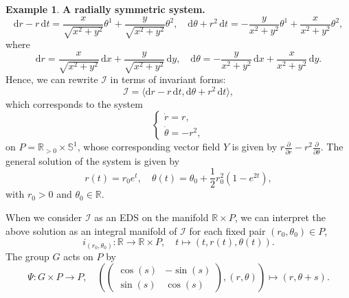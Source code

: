 \documentclass[11pt]{article}
\theoremstyle{plain}
\theoremstyle{definition}
\newtheorem{example}{Example}
\begin{document}
\begin{example} {\bf A radially symmetric system.}
\begin{equation*}
    \mathrm{d}r-r \, \mathrm{d}t=\frac{x}{\sqrt{x^2+y^2}}\theta^1+\frac{y}{\sqrt{x^2+y^2}}\theta^2,\quad \mathrm{d}\theta+r^2 \, \mathrm{d}t=-\frac{y}{x^2+y^2}\theta^1+\frac{x}{x^2+y^2}\theta^2,
\end{equation*}
where
\begin{equation*}
    \mathrm{d}r=\frac{x}{\sqrt{x^2+y^2}} \, \mathrm{d}x+\frac{y}{\sqrt{x^2+y^2}} \, \mathrm{d}y,\quad \mathrm{d}\theta=-\frac{y}{x^2+y^2} \, \mathrm{d}x+\frac{x}{x^2+y^2} \, \mathrm{d}y.
\end{equation*}
Hence, we can rewrite $\mathcal{I}$ in terms of invariant forms:
\begin{equation*}
    \mathcal{I}=\langle \mathrm{d}r-r \, \mathrm{d}t,\mathrm{d}\theta+r^2 \, \mathrm{d}t\rangle,
\end{equation*}
which corresponds to the system
\begin{equation}\label{eqn:systempolar}
    \begin{cases} \dot{r}=r, \\ \dot{\theta}=-r^2, \end{cases}
\end{equation}
on $P=\mathbb{R}_{>0}\times \mathbb{S}^1$, whose corresponding vector field $Y$ is given by $r\frac{\partial}{\partial r}-r^2\frac{\partial}{\partial\theta}$. 
The general solution of the system is given by
\begin{equation} \label{eq:solrtheta}
    r(t)=r_0 e^t,\quad \theta(t)=\theta_0+\frac{1}{2}r_0^2 (1-e^{2t}),
\end{equation}
with $r_0>0$ and $\theta_0\in \mathbb{R}$. 

When we consider $\mathcal I$ as an EDS on the manifold ${\mathbb R}\times P$, we can interpret the above solution as an integral manifold of $\mathcal I$ for each fixed pair $(r_0,\theta_0)\in P$,
\begin{equation*}
    {i}_{(r_0,\theta_0)}\colon \mathbb R \longrightarrow \mathbb R \times P,\quad t \longmapsto (t,r(t),\theta(t)).
\end{equation*}
The group $G$ acts on $P$ by
\begin{equation*}
    \Psi\colon G\times P\longrightarrow P,\quad \left(\begin{pmatrix} \cos(s) & -\sin(s) \\ \sin(s) & \cos(s) \end{pmatrix},(r,\theta)\right)\longmapsto (r,\theta+s).
\end{equation*}



\end{example}
\end{document}
